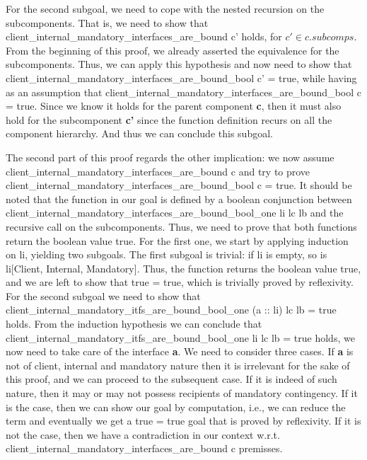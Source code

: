 \begin{lemma}
	  For the second subgoal, we need to cope with the nested recursion on the sub\textsf{component}s. That is,
	we need to show that \textsf{client_internal_mandatory_interfaces_are_bound c'} holds, for $c' \in c.subcomps$.	
	From the beginning of this proof, we already asserted the equivalence for the sub\textsf{component}s. Thus, we can apply this 
	hypothesis and now need to show that \textsf{client_internal_mandatory_interfaces_are_bound_bool c' = true}, while having as 
	an assumption that \textsf{client_internal_mandatory_interfaces_are_bound_bool c = true}. Since we know it holds for the
	parent \textsf{component} \textbf{c}, then it must also hold for the sub\textsf{component} \textbf{c'} since the function definition
	recurs on all the \textsf{component} hierarchy. And thus we can conclude this subgoal. 
			
	The second part of this proof regards	the other implication: we now assume
	\textsf{client_internal_mandatory_interfaces_are_bound c} and try to prove
	\textsf{client_internal_mandatory_interfaces_are_bound_bool c = true}.
	It should be noted that the function in our goal is defined by a boolean conjunction
	between \textsf{client_internal_mandatory_interfaces_are_bound_bool_one li lc lb} and
	the recursive call on the sub\textsf{component}s.	Thus, we need to prove that both functions return
	the boolean value true. For the first one, we start by applying induction on \textsf{li}, yielding two subgoals.
	The first subgoal is trivial: if \textsf{li} is empty, so is \textsf{li[Client, Internal, Mandatory]}. Thus, the function
	returns the boolean value true, and we are left to show that \textsf{true = true}, which is trivially proved by reflexivity.
	For the second subgoal we need to show that 
	\textsf{client_internal_mandatory_itfs_are_bound_bool_one (a :: li) lc lb = true} holds. From the induction hypothesis
	we can conclude that \textsf{client_internal_mandatory_itfs_are_bound_bool_one li lc lb = true} holds,
	we now need to take care of the \textsf{interface} \textbf{a}. We need to consider three cases.
	If \textbf{a} is not of \textsf{client},
	\textsf{internal} and \textsf{mandatory} nature then it is irrelevant for the sake of this proof, and we can
	proceed to the subsequent case. If it is indeed of such nature, then it may or may not possess recipients
	of \textsf{mandatory} \textsf{contingency}. If it is the case, then we can show our goal by computation, i.e.,
	we can reduce the term and eventually we get a \textsf{true = true} goal that is proved by reflexivity.
	If it is not the case, then we have a contradiction in our context w.r.t. 
	\textsf{client_internal_mandatory_interfaces_are_bound c} premisses.
	

\end{lemma}
